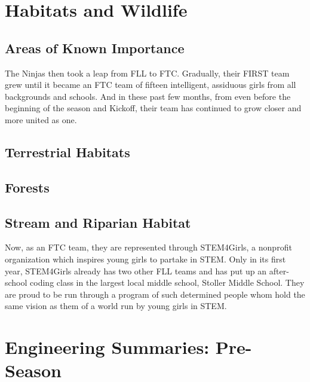 \documentclass[11pt,fleqn]{book} %
\begin{document}
\part{Habitats and Wildlife}

\chapter{Areas of Known Importance}

\noindent The Ninjas then took a leap from FLL to FTC. Gradually, their FIRST team grew until it became an FTC team of fifteen intelligent, assiduous girls from all backgrounds and schools. And in these past few months, from even before the beginning of the season and Kickoff, their team has continued to grow closer and more united as one.\\


\chapter{Terrestrial Habitats}

\chapter{Forests}

\chapter{Stream and Riparian Habitat}
\noindent Now, as an FTC team, they are represented through STEM4Girls, a nonprofit organization which inspires young girls to partake in STEM. Only in its first year, STEM4Girls already has two other FLL teams and has put up an after-school coding class in the largest local middle school, Stoller Middle School. They are proud to be run through a program of such determined people whom hold the same vision as them of a world run by young girls in STEM.\\


\part{Engineering Summaries: Pre-Season}


\end{document}
